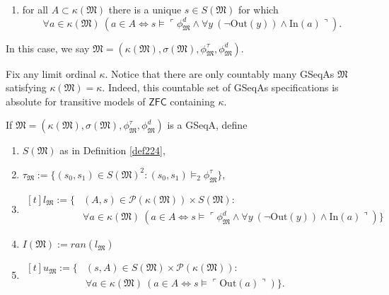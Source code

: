 \documentclass[12pt]{article}
\numberwithin{equation}{section}
\begin{document}
\begin{defi}
\begin{enumerate}[label=(D\arabic*)]
    \item\label{8222d8} for all $A \subset \kappa(\mathfrak{M})$ there is a unique $s \in S(\mathfrak{M})$ for which
    \begin{equation*}
        \forall a \in \kappa(\mathfrak{M}) \ (a \in A \iff s \models \ulcorner \phi^d_{\mathfrak{M}} \wedge \forall y \ (\neg \mathrm{Out}(y)) \wedge \mathrm{In}(a) \urcorner) \text{.}
    \end{equation*}
\end{enumerate}
In this case, we say $\mathfrak{M} = (\kappa(\mathfrak{M}), \sigma(\mathfrak{M}), \phi^{\tau}_{\mathfrak{M}}, \phi^d_{\mathfrak{M}})$.
\end{defi}

\begin{rem}\label{rem225}
Fix any limit ordinal $\kappa$. Notice that there are only countably many GSeqAs $\mathfrak{M}$ satisfying $\kappa(\mathfrak{M}) = \kappa$. Indeed, this countable set of GSeqAs specifications is absolute for transitive models of $\mathsf{ZFC}$ containing $\kappa$.
\end{rem}

\begin{defi}
If $\mathfrak{M} = (\kappa(\mathfrak{M}), \sigma(\mathfrak{M}), \phi^{\tau}_{\mathfrak{M}}, \phi^d_{\mathfrak{M}})$ is a GSeqA, define 
\begin{enumerate}[label=(\arabic*)]
    \item $S(\mathfrak{M})$ as in Definition \ref{def224},
    \item $\tau_{\mathfrak{M}} := \{(s_0, s_1) \in S(\mathfrak{M})^2 : (s_0, s_1) \models_2 \phi^{\tau}_{\mathfrak{M}}\}$,
    \item 
    \!
    $\begin{aligned}[t]
       l_{\mathfrak{M}} := \{ & (A, s) \in \mathcal{P}(\kappa(\mathfrak{M})) \times S(\mathfrak{M}) : \\
       & \forall a \in \kappa(\mathfrak{M}) \ (a \in A \iff s \models \ulcorner \phi^d_{\mathfrak{M}} \wedge \forall y \ (\neg \mathrm{Out}(y)) \wedge \mathrm{In}(a) \urcorner)\} 
    \end{aligned}$
    \item $I(\mathfrak{M}) := ran(l_{\mathfrak{M}})$
    \item 
    \!
    $\begin{aligned}[t]
        u_{\mathfrak{M}} := \{ & (s, A) \in S(\mathfrak{M}) \times \mathcal{P}(\kappa(\mathfrak{M})) : \\
        & \forall a \in \kappa(\mathfrak{M}) \ (a \in A \iff s \models \ulcorner \mathrm{Out}(a) \urcorner)\} \text{.}
    \end{aligned}$
\end{enumerate}
\end{defi}
\end{document}
